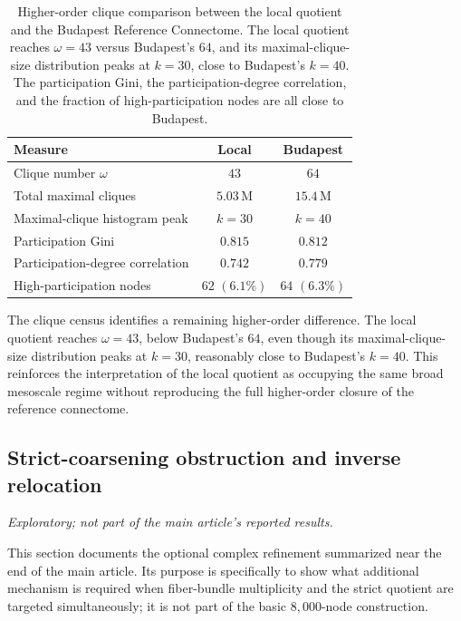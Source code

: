 \documentclass[12pt]{article}
\begin{document}
\begin{table}[H]
\centering
\small
\setlength{\tabcolsep}{4pt}
\renewcommand{\arraystretch}{1.12}
\begin{tabular}{lcc}
\toprule
Measure & Local & Budapest \\
\midrule
Clique number \(\omega\) & \(43\) & \(64\) \\
Total maximal cliques & \(5.03\,\mathrm{M}\) & \(15.4\,\mathrm{M}\) \\
Maximal-clique histogram peak & \(k=30\) & \(k=40\) \\
Participation Gini & \(0.815\) & \(0.812\) \\
Participation-degree correlation & \(0.742\) & \(0.779\) \\
High-participation nodes & \(62\) \((6.1\%)\) & \(64\) \((6.3\%)\) \\
\bottomrule
\end{tabular}
\caption{Higher-order clique comparison between the local quotient and the
Budapest Reference Connectome.  The local quotient reaches \(\omega=43\)
versus Budapest's \(64\), and its maximal-clique-size distribution peaks at
\(k=30\), close to Budapest's \(k=40\).  The participation Gini, the
participation-degree correlation, and the fraction of high-participation
nodes are all close to Budapest.}
\label{tab:local-repair-cliques}
\end{table}

The clique census identifies a remaining higher-order difference.  The local
quotient reaches \(\omega=43\), below Budapest's \(64\), even though its
maximal-clique-size distribution peaks at \(k=30\), reasonably close to
Budapest's \(k=40\).  This reinforces the interpretation of the local
quotient as occupying the same broad mesoscale regime without reproducing the
full higher-order closure of the reference connectome.


\subsection{Strict-coarsening obstruction and inverse relocation}
\label{supp:inverse-relocation}
\emph{Exploratory; not part of the main article's reported results.}

This section documents the optional complex refinement summarized near the end
of the main article. Its purpose is specifically to show what additional
mechanism is required when fiber-bundle multiplicity and the strict quotient
are targeted simultaneously; it is not part of the basic $8{,}000$-node
construction.
\end{document}
